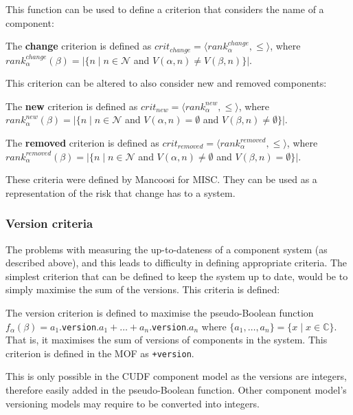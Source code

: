 This function can be used to define a criterion that considers the name of a component:
\begin{defs}
	The \textbf{change} criterion is defined as $crit_{change} = \langle rank^{change}_{\alpha}, \leq \rangle$,
	where $rank^{change}_{\alpha}(\beta) = |\{n \mid n \in \mathcal{N}$ and $V(\alpha,n) \neq V(\beta,n) \}|$.
\end{defs}

This criterion can be altered to also consider new and removed components:
\begin{defs}
	The \textbf{new} criterion is defined as $crit_{new} = \langle rank^{new}_{\alpha}, \leq \rangle$,
	where $rank^{new}_{\alpha}(\beta) = |\{n \mid n \in \mathcal{N}$ and $V(\alpha,n) = \emptyset$ and $V(\beta,n) \neq \emptyset\}|$.
\end{defs}

\begin{defs}
	The \textbf{removed} criterion is defined as $crit_{removed} = \langle rank^{removed}_{\alpha}, \leq \rangle$,
	where $rank^{removed}_{\alpha}(\beta) = |\{n \mid n \in \mathcal{N}$ and $V(\alpha,n) \neq \emptyset$ and $V(\beta,n) =\emptyset\}|$.
\end{defs}

These criteria were defined by Mancoosi for MISC.
They can be used as a representation of the risk that change has to a system.

\subsubsection{Version criteria}
The problems with measuring the up-to-dateness of a component system (as described above), and this leads to difficulty in defining appropriate criteria.
The simplest criterion that can be defined to keep the system up to date, would be to simply maximise the sum of the versions.
This criteria is defined:

\begin{defs}
	The version criterion is defined to maximise the pseudo-Boolean function $f_{\alpha}(\beta) = a_1$.\verb+version+$.a_1 + \ldots + a_n$.\verb+version+$.a_n$
	where $\{a_1,\ldots,a_n\} = \{x \mid x \in \mathbb{C}\}$.
	That is, it maximises the sum of versions of components in the system.
	This criterion is defined in the MOF as \verb!+version!.
\end{defs}

This is only possible in the CUDF component model as the versions are integers, therefore easily added in the pseudo-Boolean function.
Other component model's versioning models may require to be converted into integers.

